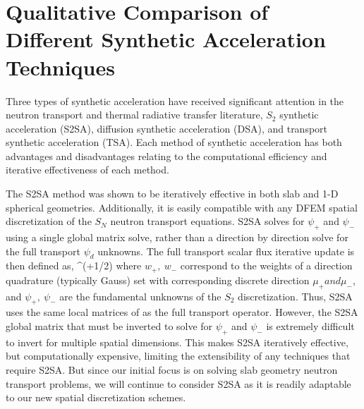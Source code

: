 \section{Qualitative Comparison of Different Synthetic Acceleration Techniques}
\label{sec:synthetics}

Three types of synthetic acceleration have received significant attention in the neutron transport and thermal radiative transfer literature,
$S_2$ synthetic acceleration (S2SA)\cite{s2sa}, diffusion synthetic acceleration (DSA)\cite{old_dsa}, and transport synthetic acceleration (TSA)\cite{tsa}.
Each method of synthetic acceleration has both advantages and disadvantages relating to the computational efficiency and iterative effectiveness of each method.  

The S2SA method was shown to be iteratively effective in both slab and 1-D spherical geometries. 
Additionally, it is easily compatible with any DFEM spatial discretization of the $S_N$ neutron transport equations.  
S2SA solves for $\psi_+$ and $\psi_-$ using a single global matrix solve, rather than a direction by direction solve for the full transport $\psi_d$ unknowns.
The full transport scalar flux iterative update is then defined as,
\benum
\Delta \phi^{(\ell+1/2)} \pi {} \pec
\eenum
where $w_+,~w_-$ correspond to the weights of a direction quadrature (typically Gauss) set with corresponding discrete direction $\mu_+ and \mu_-$, and $\psi_+,~\psi_-$ are the fundamental unknowns of the $S_2$ discretization.
Thus, S2SA uses the same local matrices of  as the full transport operator.
However, the S2SA global matrix that must be inverted to solve for $\psi_+$ and $\psi_-$ is extremely difficult to invert for multiple spatial dimensions.
This makes S2SA iteratively effective, but computationally expensive, limiting the extensibility of any techniques that require S2SA.
But since our initial focus is on solving slab geometry neutron transport problems, we will continue to consider S2SA as it is readily adaptable to our new spatial discretization schemes. \cite{s2sa}

